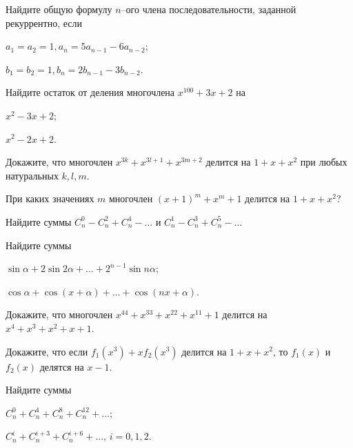 \documentclass[a4paper, 12pt, num=22, date=16.09.2019]{listok}
\begin{document}
\begin{problem}
	Найдите общую формулу $n$--ого члена последовательности, заданной рекуррентно, если
	\begin{multienum}{2}
		\item $a_1 = a_2 = 1, a_n = 5a_{n-1} - 6a_{n-2}$;
		\item $b_1 = b_2 = 1, b_n = 2b_{n-1} - 3b_{n-2}$.
	\end{multienum}
\end{problem}
\begin{problem}
	Найдите остаток от деления многочлена $x^{100} + 3x + 2$ на
	\begin{multienum}{2}
		\item $x^2 - 3x + 2$;
		\item $x^2 - 2x + 2$.
	\end{multienum}
\end{problem}
\begin{problem}
	Докажите, что многочлен $x^{3k} + x^{3l+1} + x^{3m+2}$ делится на $1 + x + x^2$ при любых натуральных $k, l, m$.
\end{problem}
\begin{problem}
	При каких значениях $m$ многочлен ${(x + 1)}^m + x^m + 1$ делится на $1 + x + x^2$?
\end{problem}
\begin{problem}
	Найдите суммы $C_n^0 - C_n^2 + C_n^4 - \ldots$ и $C_n^1 - C_n^3 + C_n^5 - \ldots$
\end{problem}
\begin{problem}
	Найдите суммы
	\begin{multienum}{2}
		\item $\sin \alpha + 2 \sin{2\alpha} + \ldots + 2^{n-1} \sin{n\alpha}$;
		\item $\cos \alpha + \cos{(x + \alpha)} + \ldots + \cos{(nx + \alpha)}$.
	\end{multienum}
\end{problem}
\begin{problem}
	Докажите, что многочлен $x^{44} + x^{33} + x^{22} + x^{11} + 1$ делится на $x^4 + x^3 + x^2 + x + 1$.
\end{problem}
\begin{problem}
	Докажите, что если $f_1(x^3) + x f_2(x^3)$ делится на $1 + x + x^2$, то $f_1(x)$ и $f_2(x)$ делятся на $x - 1$.
\end{problem}
\begin{problem}
	Найдите суммы
	\begin{multienum}{2}
		\item $C_n^0 + C_n^4 + C_n^8 + C_n^{12} + \ldots$;
		\item $C_n^i + C_n^{i + 3} + C_n^{i + 6} + \ldots$, $i = 0, 1, 2$.
	\end{multienum}
\end{problem}
\end{document}
